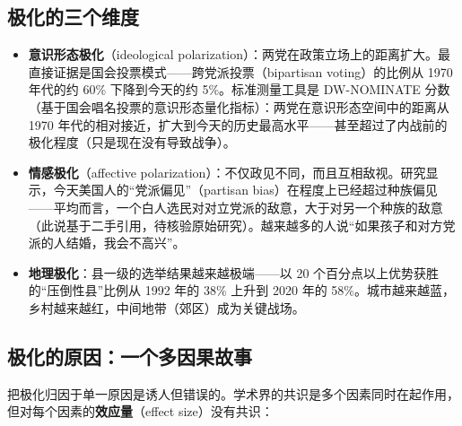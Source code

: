 \documentclass[12pt,a4paper]{ctexart}
\begin{document}
\subsection{极化的三个维度}

\begin{itemize}
  \item \textbf{意识形态极化}（ideological polarization）：两党在政策立场上的距离扩大。最直接证据是国会投票模式——跨党派投票（bipartisan voting）的比例从 1970 年代的约 60\% 下降到今天的约 5\%。标准测量工具是 DW-NOMINATE 分数（基于国会唱名投票的意识形态量化指标）：两党在意识形态空间中的距离从 1970 年代的相对接近，扩大到今天的历史最高水平——甚至超过了内战前的极化程度（只是现在没有导致战争）。
  \item \textbf{情感极化}（affective polarization）：不仅政见不同，而且互相敌视。研究显示，今天美国人的``党派偏见''（partisan bias）在程度上已经超过种族偏见——平均而言，一个白人选民对对立党派的敌意，大于对另一个种族的敌意（此说基于二手引用，待核验原始研究）。越来越多的人说``如果孩子和对方党派的人结婚，我会不高兴''。
  \item \textbf{地理极化}：县一级的选举结果越来越极端——以 20 个百分点以上优势获胜的``压倒性县''比例从 1992 年的 38\% 上升到 2020 年的 58\%。城市越来越蓝，乡村越来越红，中间地带（郊区）成为关键战场。
\end{itemize}

\subsection{极化的原因：一个多因果故事}

把极化归因于单一原因是诱人但错误的。学术界的共识是多个因素同时在起作用，但对每个因素的\textbf{效应量}（effect size）没有共识：
\end{document}

